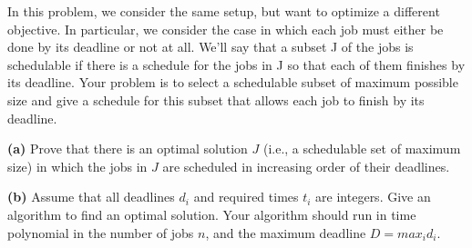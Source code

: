 \documentclass[11pt]{article}
\begin{document}
In this problem, we consider the same setup, but want to optimize a different objective. In particular, we consider the case in which each job must either be done by its deadline or not at all. We'll say that a subset J of the jobs is schedulable if there is a schedule for the jobs in J so that each of them finishes by its deadline. Your problem is to select a schedulable subset of maximum possible size and give a schedule for this subset that allows each job to finish by its deadline. 

\vspace{2mm}

\noindent \textbf{(a)} Prove that there is an optimal solution $J$ (i.e., a schedulable set of maximum size) in which the jobs in $J$ are scheduled in increasing order of their deadlines. 

\vspace{2mm}

\noindent \textbf{(b)} Assume that all deadlines $d_i$ and required times $t_i$ are integers. Give an algorithm to find an optimal solution. Your algorithm should run in time polynomial in the number of jobs $n$, and the maximum deadline $D = max_i d_i$. 
\end{document}
